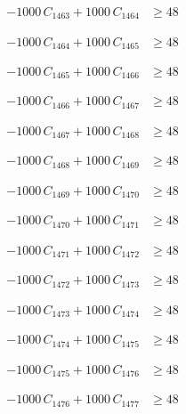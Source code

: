 \documentclass[a4paper,11pt]{article}
\begin{document}
\begin{align}
-1000\,C_{1463} + 1000\,C_{1464} &\geq 48 \nonumber
\end{align}

\begin{align}
-1000\,C_{1464} + 1000\,C_{1465} &\geq 48 \nonumber
\end{align}

\begin{align}
-1000\,C_{1465} + 1000\,C_{1466} &\geq 48 \nonumber
\end{align}

\begin{align}
-1000\,C_{1466} + 1000\,C_{1467} &\geq 48 \nonumber
\end{align}

\begin{align}
-1000\,C_{1467} + 1000\,C_{1468} &\geq 48 \nonumber
\end{align}

\begin{align}
-1000\,C_{1468} + 1000\,C_{1469} &\geq 48 \nonumber
\end{align}

\begin{align}
-1000\,C_{1469} + 1000\,C_{1470} &\geq 48 \nonumber
\end{align}

\begin{align}
-1000\,C_{1470} + 1000\,C_{1471} &\geq 48 \nonumber
\end{align}

\begin{align}
-1000\,C_{1471} + 1000\,C_{1472} &\geq 48 \nonumber
\end{align}

\begin{align}
-1000\,C_{1472} + 1000\,C_{1473} &\geq 48 \nonumber
\end{align}

\begin{align}
-1000\,C_{1473} + 1000\,C_{1474} &\geq 48 \nonumber
\end{align}

\begin{align}
-1000\,C_{1474} + 1000\,C_{1475} &\geq 48 \nonumber
\end{align}

\begin{align}
-1000\,C_{1475} + 1000\,C_{1476} &\geq 48 \nonumber
\end{align}

\begin{align}
-1000\,C_{1476} + 1000\,C_{1477} &\geq 48 \nonumber
\end{align}
\end{document}
